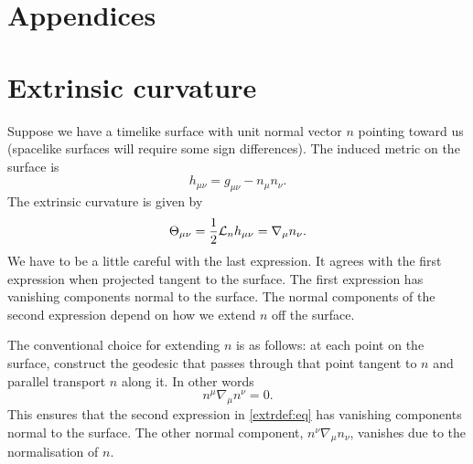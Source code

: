 \documentclass[12pt]{article}
\begin{document}
\section*{Appendices}
\appendix

\section{Extrinsic curvature}\label{sec:extrinsic}

Suppose we have a timelike surface with unit normal vector $n$ pointing toward us (spacelike surfaces will require some sign differences). The induced metric on the surface is
%
\begin{equation}\label{indmet:eq}
  h_{\mu\nu} = g_{\mu\nu} - n_\mu n_\nu.
\end{equation}
%
The extrinsic curvature is given by \cite{Wald-GeneRela:84}
%
\begin{equation}\label{extrdef:eq}
  \Theta_{\mu\nu} = \frac{1}{2} \mathcal{L}_n h_{\mu\nu} = \nabla_\mu n_\nu.
\end{equation}
%
We have to be a little careful with the last expression. It agrees with the first expression when projected tangent to the surface. The first expression has vanishing components normal to the surface. The normal components of the second expression depend on how we extend $n$ off the surface.

The conventional choice for extending $n$ is as follows: at each point on the surface, construct the geodesic that passes through that point tangent to $n$ and parallel transport $n$ along it. In other words
%
\begin{equation}\label{geodesic:eq}
  n^\mu \nabla_\mu n^\nu = 0.
\end{equation}
%
This ensures that the second expression in \eqref{extrdef:eq} has vanishing components normal to the surface. The other normal component, $n^\nu \nabla_\mu n_\nu$, vanishes due to the normalisation of $n$.
\end{document}
